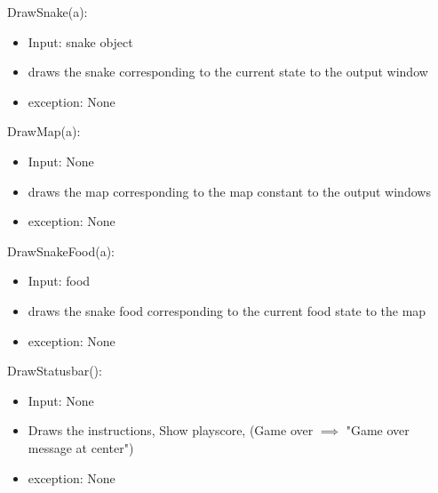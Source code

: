 \documentclass[12pt, titlepage]{article}
\begin{document}
\noindent DrawSnake(a):
\begin{itemize}
\item Input: snake object
\item draws the snake corresponding to the current state to the output window
\item exception: None\\
\end{itemize}

\noindent DrawMap(a):
\begin{itemize}
\item Input: None
\item draws the map corresponding to the map constant to the output windows
\item exception: None\\
\end{itemize}

\noindent DrawSnakeFood(a):
\begin{itemize}
\item Input: food
\item draws the snake food corresponding to the current food state to the map
\item exception: None\\
\end{itemize}


\noindent DrawStatusbar():
\begin{itemize}
\item Input: None
\item Draws the instructions, Show playscore, (Game over $\implies$ "Game over message at center")
\item exception: None\\
\end{itemize}
\end{document}
